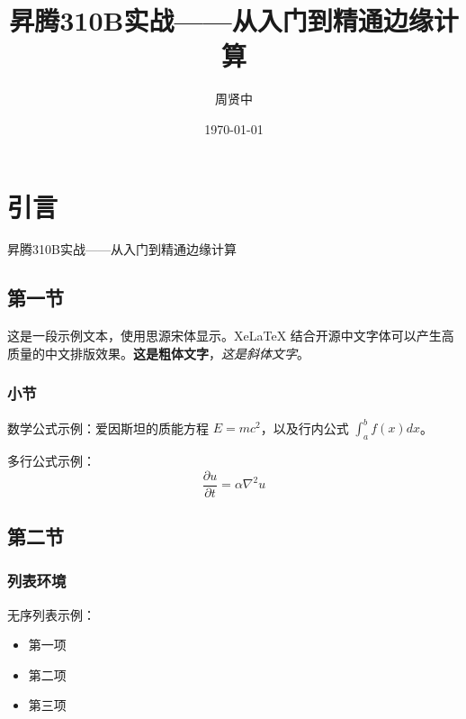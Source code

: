 \documentclass[fontsize=12pt, paper=a4, twoside, openright, DIV=calc]{scrbook}
\title{昇腾310B实战——从入门到精通边缘计算}
\author{周贤中}
\date{\today}
\theoremstyle{break}
\begin{document}
\maketitle

\frontmatter


\tableofcontents

\mainmatter

\chapter{引言}
昇腾310B实战——从入门到精通边缘计算

\section{第一节}

这是一段示例文本，使用思源宋体显示。XeLaTeX 结合开源中文字体可以产生高质量的中文排版效果。\textbf{这是粗体文字}，\textit{这是斜体文字}。

\subsection{小节}

数学公式示例：爱因斯坦的质能方程 $E = mc^2$，以及行内公式 $\int_a^b f(x) dx$。

多行公式示例：
\begin{equation}
\frac{\partial u}{\partial t} = \alpha \nabla^2 u
\end{equation}

\section{第二节}

\subsection{列表环境}

无序列表示例：
\begin{itemize}
\item 第一项
\item 第二项
\item 第三项
\end{itemize}
\end{document}
